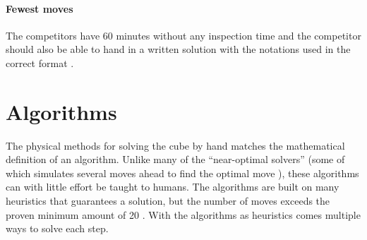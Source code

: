 \documentclass[a4paper,11pt]{kth-mag}
\begin{document}
\paragraph{Fewest moves}
The competitors have 60 minutes without any inspection time and the competitor should also be able to hand in a written solution with the notations used in the correct format \cite{WCA2}.
\section{Algorithms}
The physical methods for solving the cube by hand matches the mathematical definition of an algorithm. Unlike many of the “near-optimal solvers” (some of which simulates several moves ahead to find the optimal move \cite{Kociemba}), these algorithms can with little effort be taught to humans. The algorithms are built on many heuristics that guarantees a solution, but the number of moves exceeds the proven minimum amount of 20 \cite{cube20}. With the algorithms as heuristics comes multiple ways to solve each step.  
\end{document}
